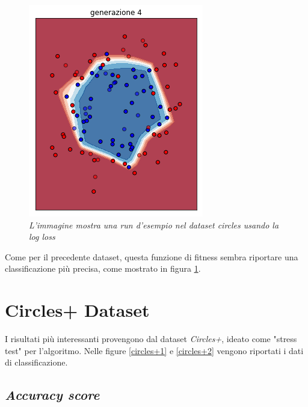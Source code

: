 \documentclass[12pt,a4paper]{report}
\begin{document}
\begin{figure}[H]
 \includegraphics[scale = 0.35]{images/circle-rnd-log/4}
 \caption{\textit{L'immagine mostra una run d'esempio nel dataset circles usando la log loss}}
 \label{circles2}
\end{figure}

Come per il precedente dataset, questa funzione di fitness sembra riportare una classificazione più precisa, come mostrato in figura \ref{circles2}.

\section{Circles+ Dataset}

I risultati più interessanti provengono dal dataset \textit{Circles+}, ideato come "stress test" per l'algoritmo. Nelle figure \ref{circles+1} e \ref{circles+2} vengono riportati i dati di classificazione.

\subsection{\textit{Accuracy score}}
\end{document}
